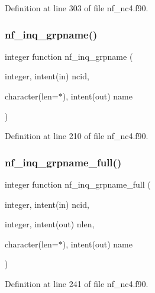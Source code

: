 Definition at line 303 of file nf\+\_\+nc4.\+f90.

\mbox{\label{nf__nc4_8f90_a4f4d483535b5162b27baa41a09e396bc}} 
\subsubsection{\texorpdfstring{nf\+\_\+inq\+\_\+grpname()}{nf\_inq\_grpname()}}
{\footnotesize\ttfamily integer function nf\+\_\+inq\+\_\+grpname (\begin{DoxyParamCaption}\item[{integer, intent(in)}]{ncid,  }\item[{character(len=$\ast$), intent(out)}]{name }\end{DoxyParamCaption})}



Definition at line 210 of file nf\+\_\+nc4.\+f90.

\mbox{\label{nf__nc4_8f90_aea3bc6ceef0b64f33289cab0cedbc302}} 
\subsubsection{\texorpdfstring{nf\+\_\+inq\+\_\+grpname\+\_\+full()}{nf\_inq\_grpname\_full()}}
{\footnotesize\ttfamily integer function nf\+\_\+inq\+\_\+grpname\+\_\+full (\begin{DoxyParamCaption}\item[{integer, intent(in)}]{ncid,  }\item[{integer, intent(out)}]{nlen,  }\item[{character(len=$\ast$), intent(out)}]{name }\end{DoxyParamCaption})}



Definition at line 241 of file nf\+\_\+nc4.\+f90.

\mbox{\label{nf__nc4_8f90_ab9eaa313ab271f6ff25d99c62a3f6a68}} 
